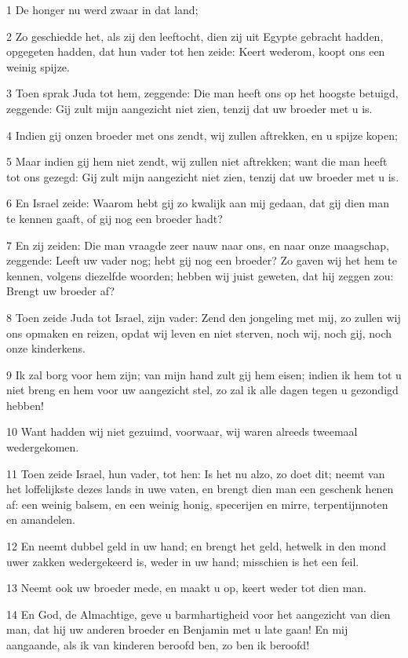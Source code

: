 \par 1 De honger nu werd zwaar in dat land;
\par 2 Zo geschiedde het, als zij den leeftocht, dien zij uit Egypte gebracht hadden, opgegeten hadden, dat hun vader tot hen zeide: Keert wederom, koopt ons een weinig spijze.
\par 3 Toen sprak Juda tot hem, zeggende: Die man heeft ons op het hoogste betuigd, zeggende: Gij zult mijn aangezicht niet zien, tenzij dat uw broeder met u is.
\par 4 Indien gij onzen broeder met ons zendt, wij zullen aftrekken, en u spijze kopen;
\par 5 Maar indien gij hem niet zendt, wij zullen niet aftrekken; want die man heeft tot ons gezegd: Gij zult mijn aangezicht niet zien, tenzij dat uw broeder met u is.
\par 6 En Israel zeide: Waarom hebt gij zo kwalijk aan mij gedaan, dat gij dien man te kennen gaaft, of gij nog een broeder hadt?
\par 7 En zij zeiden: Die man vraagde zeer nauw naar ons, en naar onze maagschap, zeggende: Leeft uw vader nog; hebt gij nog een broeder? Zo gaven wij het hem te kennen, volgens diezelfde woorden; hebben wij juist geweten, dat hij zeggen zou: Brengt uw broeder af?
\par 8 Toen zeide Juda tot Israel, zijn vader: Zend den jongeling met mij, zo zullen wij ons opmaken en reizen, opdat wij leven en niet sterven, noch wij, noch gij, noch onze kinderkens.
\par 9 Ik zal borg voor hem zijn; van mijn hand zult gij hem eisen; indien ik hem tot u niet breng en hem voor uw aangezicht stel, zo zal ik alle dagen tegen u gezondigd hebben!
\par 10 Want hadden wij niet gezuimd, voorwaar, wij waren alreeds tweemaal wedergekomen.
\par 11 Toen zeide Israel, hun vader, tot hen: Is het nu alzo, zo doet dit; neemt van het loffelijkste dezes lands in uwe vaten, en brengt dien man een geschenk henen af: een weinig balsem, en een weinig honig, specerijen en mirre, terpentijnnoten en amandelen.
\par 12 En neemt dubbel geld in uw hand; en brengt het geld, hetwelk in den mond uwer zakken wedergekeerd is, weder in uw hand; misschien is het een feil.
\par 13 Neemt ook uw broeder mede, en maakt u op, keert weder tot dien man.
\par 14 En God, de Almachtige, geve u barmhartigheid voor het aangezicht van dien man, dat hij uw anderen broeder en Benjamin met u late gaan! En mij aangaande, als ik van kinderen beroofd ben, zo ben ik beroofd!
